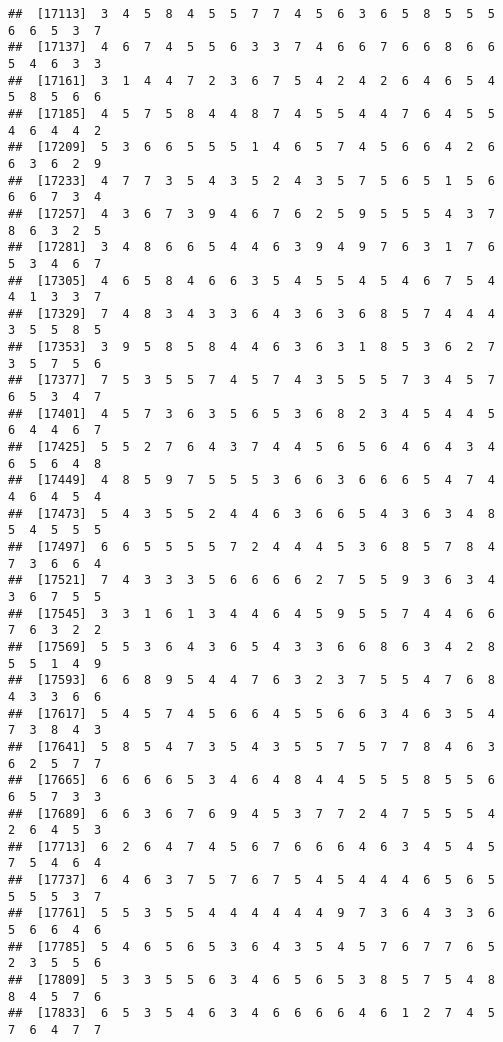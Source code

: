 \documentclass[
]{book}
\begin{document}
\begin{verbatim}
##  [17113]  3  4  5  8  4  5  5  7  7  4  5  6  3  6  5  8  5  5  5  6  6  5  3  7
##  [17137]  4  6  7  4  5  5  6  3  3  7  4  6  6  7  6  6  8  6  6  5  4  6  3  3
##  [17161]  3  1  4  4  7  2  3  6  7  5  4  2  4  2  6  4  6  5  4  5  8  5  6  6
##  [17185]  4  5  7  5  8  4  4  8  7  4  5  5  4  4  7  6  4  5  5  4  6  4  4  2
##  [17209]  5  3  6  6  5  5  5  1  4  6  5  7  4  5  6  6  4  2  6  6  3  6  2  9
##  [17233]  4  7  7  3  5  4  3  5  2  4  3  5  7  5  6  5  1  5  6  6  6  7  3  4
##  [17257]  4  3  6  7  3  9  4  6  7  6  2  5  9  5  5  5  4  3  7  8  6  3  2  5
##  [17281]  3  4  8  6  6  5  4  4  6  3  9  4  9  7  6  3  1  7  6  5  3  4  6  7
##  [17305]  4  6  5  8  4  6  6  3  5  4  5  5  4  5  4  6  7  5  4  4  1  3  3  7
##  [17329]  7  4  8  3  4  3  3  6  4  3  6  3  6  8  5  7  4  4  4  3  5  5  8  5
##  [17353]  3  9  5  8  5  8  4  4  6  3  6  3  1  8  5  3  6  2  7  3  5  7  5  6
##  [17377]  7  5  3  5  5  7  4  5  7  4  3  5  5  5  7  3  4  5  7  6  5  3  4  7
##  [17401]  4  5  7  3  6  3  5  6  5  3  6  8  2  3  4  5  4  4  5  6  4  4  6  7
##  [17425]  5  5  2  7  6  4  3  7  4  4  5  6  5  6  4  6  4  3  4  6  5  6  4  8
##  [17449]  4  8  5  9  7  5  5  5  3  6  6  3  6  6  6  5  4  7  4  4  6  4  5  4
##  [17473]  5  4  3  5  5  2  4  4  6  3  6  6  5  4  3  6  3  4  8  5  4  5  5  5
##  [17497]  6  6  5  5  5  5  7  2  4  4  4  5  3  6  8  5  7  8  4  7  3  6  6  4
##  [17521]  7  4  3  3  3  5  6  6  6  6  2  7  5  5  9  3  6  3  4  3  6  7  5  5
##  [17545]  3  3  1  6  1  3  4  4  6  4  5  9  5  5  7  4  4  6  6  7  6  3  2  2
##  [17569]  5  5  3  6  4  3  6  5  4  3  3  6  6  8  6  3  4  2  8  5  5  1  4  9
##  [17593]  6  6  8  9  5  4  4  7  6  3  2  3  7  5  5  4  7  6  8  4  3  3  6  6
##  [17617]  5  4  5  7  4  5  6  6  4  5  5  6  6  3  4  6  3  5  4  7  3  8  4  3
##  [17641]  5  8  5  4  7  3  5  4  3  5  5  7  5  7  7  8  4  6  3  6  2  5  7  7
##  [17665]  6  6  6  6  5  3  4  6  4  8  4  4  5  5  5  8  5  5  6  6  5  7  3  3
##  [17689]  6  6  3  6  7  6  9  4  5  3  7  7  2  4  7  5  5  5  4  2  6  4  5  3
##  [17713]  6  2  6  4  7  4  5  6  7  6  6  6  4  6  3  4  5  4  5  7  5  4  6  4
##  [17737]  6  4  6  3  7  5  7  6  7  5  4  5  4  4  4  6  5  6  5  5  5  5  3  7
##  [17761]  5  5  3  5  5  4  4  4  4  4  4  9  7  3  6  4  3  3  6  5  6  6  4  6
##  [17785]  5  4  6  5  6  5  3  6  4  3  5  4  5  7  6  7  7  6  5  2  3  5  5  6
##  [17809]  5  3  3  5  5  6  3  4  6  5  6  5  3  8  5  7  5  4  8  8  4  5  7  6
##  [17833]  6  5  3  5  4  6  3  4  6  6  6  6  4  6  1  2  7  4  5  7  6  4  7  7

\end{verbatim}
\end{document}
